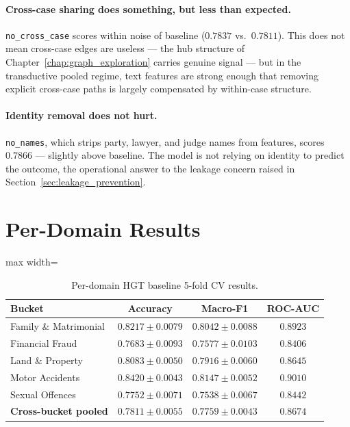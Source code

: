 \paragraph{Cross-case sharing does something, but less than expected.} \texttt{no\_cross\_case} scores within noise of baseline ($0.7837$ vs.\ $0.7811$). This does not mean cross-case edges are useless --- the hub structure of Chapter~\ref{chap:graph_exploration} carries genuine signal --- but in the transductive pooled regime, text features are strong enough that removing explicit cross-case paths is largely compensated by within-case structure.

\paragraph{Identity removal does not hurt.} \texttt{no\_names}, which strips party, lawyer, and judge names from features, scores $0.7866$ --- slightly above baseline. The model is not relying on identity to predict the outcome, the operational answer to the leakage concern raised in Section~\ref{sec:leakage_prevention}.

\section{Per-Domain Results}

\begin{table}[H]
  \centering
  \small
  \begin{adjustbox}{max width=\textwidth}
  \begin{tabular}{lccc}
    \toprule
    Bucket & Accuracy & Macro-F1 & ROC-AUC \\
    \midrule
    Family \& Matrimonial & $0.8217\pm0.0079$ & $0.8042\pm0.0088$ & $0.8923$ \\
    Financial Fraud      & $0.7683\pm0.0093$ & $0.7577\pm0.0103$ & $0.8406$ \\
    Land \& Property     & $0.8083\pm0.0050$ & $0.7916\pm0.0060$ & $0.8645$ \\
    Motor Accidents      & $0.8420\pm0.0043$ & $0.8147\pm0.0052$ & $0.9010$ \\
    Sexual Offences      & $0.7752\pm0.0071$ & $0.7538\pm0.0067$ & $0.8442$ \\
    \midrule
    \textbf{Cross-bucket pooled} & $0.7811\pm0.0055$ & $0.7759\pm0.0043$ & $0.8674$ \\
    \bottomrule
  \end{tabular}
  \end{adjustbox}
  \caption{Per-domain HGT baseline 5-fold CV results.}
  \label{tab:per_domain}
\end{table}

